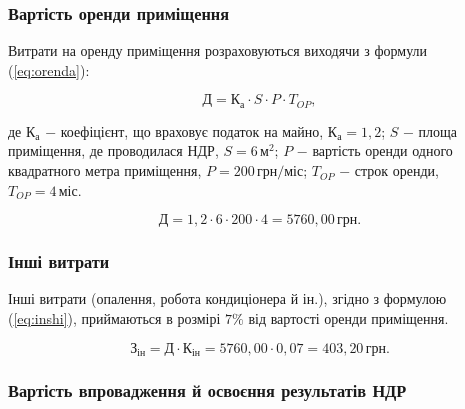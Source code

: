 \vspace{1.5em}

\subsubsection{Вартість оренди приміщення}

Витрати на оренду примiщення розраховуються виходячи з формули (\ref{eq:orenda}):

\begin{equation}\label{eq:orenda}
\text{Д} = \text{К}_{\text{а}} \cdot S \cdot P \cdot T_{OP},
\end{equation}

\noindent де $\text{К}_{\text{а}}$ $-$ коефіцієнт, що враховує податок на майно, $\text{К}_{\text{а}} = 1,2$;\newline
\hspace*{19pt}$S$ $-$ площа приміщення, де проводилася НДР, $S = 6 \, \text{м}^{2}$;\newline
\hspace*{19pt}$P$ $-$ вартість оренди одного квадратного метра приміщення, $P = 200 \, \text{грн}/\text{міс}$;\newline
\hspace*{19pt}$T_{OP}$ $-$ строк оренди, $T_{OP} = 4 \, \text{міс}$.

\[
\text{Д} = 1,2 \cdot 6 \cdot 200 \cdot 4 = 5760,00 \, \text{грн}.
\]

\vspace{1.5em}

\subsubsection{Інші витрати}

Інші витрати (опалення, робота кондиціонера й ін.), згідно з формулою (\ref{eq:inshi}), приймаються в розмірі $7\%$ від вартості оренди приміщення. 

\begin{equation}\label{eq:inshi}
\text{З}_{\text{ін}} = \text{Д} \cdot \text{К}_{\text{ін}} = 5760,00 \cdot 0,07 = 403,20 \, \text{грн}. 
\end{equation}

\vspace{1.5em}

\subsubsection{Вартість впровадження й освоєння результатів НДР}

